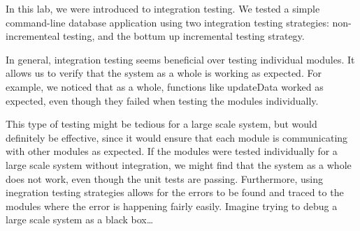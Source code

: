 In this lab, we were introduced to integration testing.  We tested a simple
command-line database application using two integration testing strategies:
non-incrementeal testing, and the bottum up incremental testing strategy.

In general, integration testing seems beneficial over testing individual
modules. It allows us to verify that the system as a whole is working as
expected. For example, we noticed that as a whole, functions like updateData
worked as expected, even though they failed when testing the modules
individually. 

This type of testing might be tedious for a large scale system, but would
definitely be effective, since it would ensure that each module is communicating
with other modules as expected. If the modules were tested individually for a
large scale system without integration, we might find that the system as a whole
does not work, even though the unit tests are passing. Furthermore, using
inegration testing strategies allows for the errors to be found and traced to
the modules where the error is happening fairly easily. Imagine trying to debug
a large scale system as a black box\dots


